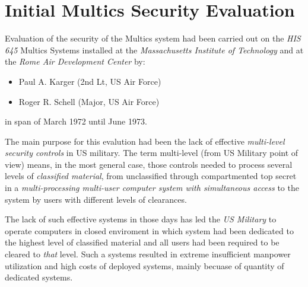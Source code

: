 






\section{Initial Multics Security Evaluation}

Evaluation of the security of the Multics system had been carried out on the \textit{HIS 645} 
Multics Systems installed at the \textit{Massachusetts Institute of Technology} and at the 
\textit{Rome Air Development Center} by:
\begin{itemize}
    \item Paul A. Karger (2nd Lt, US Air Force)
    \item Roger R. Schell (Major, US Air Force)
\end{itemize}
in span of March 1972 until June 1973.

The main purpose for this evalution had been the lack of effective \textit{multi-level security controls}
in US military. The term multi-level (from US Military point of view) means, in the most general case, 
those controls needed to process several levels of \textit{classified material}, from unclassified 
through compartmented top secret in a \textit{multi-processing multi-user computer system with simultaneous 
access} to the system by users with different levels of clearances.

The lack of such effective systems in those days has led the \textit{US Military} to operate computers
in closed enviroment in which system had been dedicated to the highest level of classified material and
all users had been required to be cleared to \textit{that} level.
Such a systems resulted in extreme insufficient manpower utilization and high costs of deployed systems,
mainly becuase of quantity of dedicated systems. 

